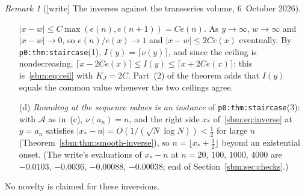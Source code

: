\documentclass[11pt,letterpaper]{article}
\numberwithin{equation}{section}
\theoremstyle{remark}\newtheorem{remark}[theorem]{Remark}
\newcommand{\file}[1]{\nolinkurl{#1}}
\begin{document}
\begin{remark}[{[write]} The inverses against the transseries volume, 6~October 2026]
\begin{enumerate}
 $|x-w|\le C\max(e(n),e(n+1))=Ce(n)$. As $y\to\infty$, $w\to\infty$ and
 $|x-w|\to0$, so $e(n)/e(x)\to1$ and $|x-w|\le2Ce(x)$ eventually. By
 \file{p0:thm:staircase}(1), $I(y)=\lceil\nu(y)\rceil$, and since the
 ceiling is nondecreasing,
 $\lceil x-2Ce(x)\rceil\le I(y)\le\lceil x+2Ce(x)\rceil$: this
 is~\eqref{sbm:eq:ceil} with $K_J=2C$. Part~(2) of the theorem adds that
 $I(y)$ equals the common value whenever the two ceilings agree.
\item[(d)] \emph{Rounding at the sequence values is an instance} of
 \file{p0:thm:staircase}(3): with $\mathcal A$ as in~(c), $\nu(a_n)=n$, and
 the right side $x_\ast$ of~\eqref{sbm:eq:inverse} at $y=a_n$ satisfies
 $|x_\ast-n|=O(1/(\sqrt N\log N))<\frac12$ for large $n$
 (Theorem~\ref{sbm:thm:smooth-inverse}), so $n=\lfloor x_\ast+\frac12\rfloor$
 beyond an existential onset. (The write's evaluations of $x_\ast-n$ at
 $n=20$, $100$, $1000$, $4000$ are $-0.0103$, $-0.0036$, $-0.00088$,
 $-0.00038$; end of Section~\ref{sbm:sec:checks}.)
\end{enumerate}
No novelty is claimed for these inversions.
\end{remark}
\end{document}
